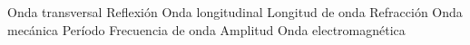 \begin{minipage}{0.4\linewidth}
    \checkboxchar{ {\color{cadmiumorange}
                $\Box$}
    }
    \begin{checkboxes}
        \choice Onda transversal \vspace{0.6cm}
        \choice Reflexión \vspace{0.6cm}
        \choice Onda longitudinal \vspace{0.6cm}
        \choice Longitud de onda \vspace{0.6cm}
        \choice Refracci\'on \vspace{0.6cm}
        \choice Onda mec\'anica \vspace{0.6cm}
        \choice Per\'iodo \vspace{0.6cm}
        \choice Frecuencia de onda \vspace{0.6cm}
        \choice Amplitud \vspace{0.6cm}
        \choice Onda electromagnética \vspace{0.6cm}
    \end{checkboxes}


\end{minipage}
